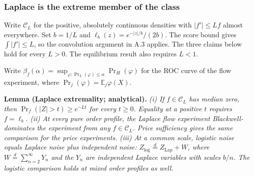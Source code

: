 
\subsubsection{Laplace is the extreme member of the class}\label{oa-a-laplace-extreme}

Write \(\mathcal C_L\) for the positive, absolutely continuous densities
with \(|f'|\le Lf\) almost everywhere.
Set \(b=1/L\) and \(\ell_b(z)=e^{-|z|/b}/(2b)\).
The score bound gives \(\int|f'|\le L\), so the convolution argument in A.3 applies.
The three claims below hold for every \(L>0\).
The equilibrium result also requires \(L<1\).
\par
Write \(\beta_f(\alpha)=\sup_{\varphi:\Pr_L(\varphi)\le\alpha}\Pr_H(\varphi)\)
for the ROC curve of the flow experiment, where \(\Pr_j(\varphi)=\mathbb E_j\varphi(X)\).


\protect{}\label{result-lemma-oa-laplace-extreme}{\textbf{Lemma
(Laplace extremality; analytical).}} \emph{(i) If \(f\in\mathcal C_L\)
has median zero, then \(\Pr_f(|Z|>t)\ge e^{-Lt}\) for every \(t\ge0\).
Equality at a positive \(t\) requires \(f=\ell_b\).
(ii) At every pure order profile, the Laplace flow experiment Blackwell-dominates the experiment from any \(f\in\mathcal C_L\).
Price sufficiency gives the same comparison for the price experiments.
(iii) At a common scale, logistic noise equals Laplace noise plus independent noise:
\(Z_{\mathrm{log}}\overset d=Z_{\mathrm{Lap}}+W\), where
\(W\overset d=\sum_{n=2}^{\infty}Y_n\) and the \(Y_n\) are independent Laplace variables with scales \(b/n\).
The logistic comparison holds at mixed order profiles as well.}

